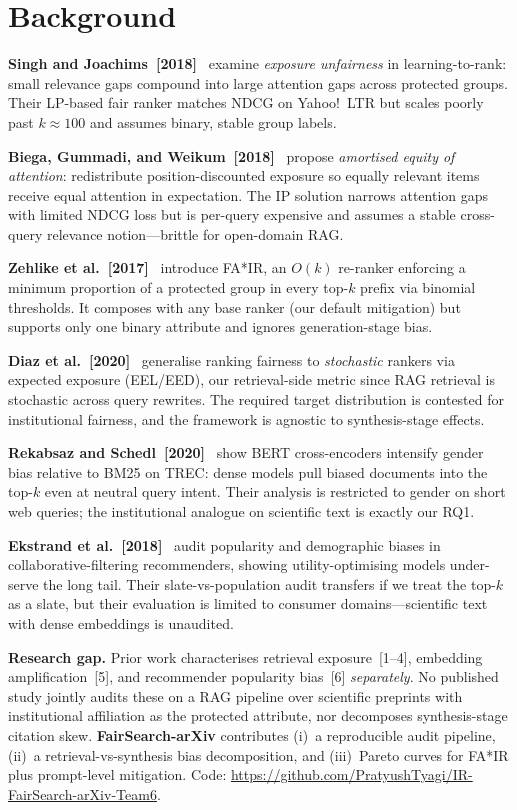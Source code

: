 \documentclass[sigconf]{acmart}
\begin{document}
\section{Background}

\textbf{Singh and Joachims~[2018]}~\cite{singh2018} examine \emph{exposure unfairness} in learning-to-rank: small relevance gaps compound into large attention gaps across protected groups. Their LP-based fair ranker matches NDCG on Yahoo!\ LTR but scales poorly past $k\!\approx\!100$ and assumes binary, stable group labels.

\textbf{Biega, Gummadi, and Weikum~[2018]}~\cite{biega2018} propose \emph{amortised equity of attention}: redistribute position-discounted exposure so equally relevant items receive equal attention in expectation. The IP solution narrows attention gaps with limited NDCG loss but is per-query expensive and assumes a stable cross-query relevance notion---brittle for open-domain RAG.

\textbf{Zehlike et al.~[2017]}~\cite{zehlike2017} introduce FA*IR, an $O(k)$ re-ranker enforcing a minimum proportion of a protected group in every top-$k$ prefix via binomial thresholds. It composes with any base ranker (our default mitigation) but supports only one binary attribute and ignores generation-stage bias.

\textbf{Diaz et al.~[2020]}~\cite{diaz2020} generalise ranking fairness to \emph{stochastic} rankers via expected exposure (EEL/EED), our retrieval-side metric since RAG retrieval is stochastic across query rewrites. The required target distribution is contested for institutional fairness, and the framework is agnostic to synthesis-stage effects.

\textbf{Rekabsaz and Schedl~[2020]}~\cite{rekabsaz2020} show BERT cross-encoders intensify gender bias relative to BM25 on TREC: dense models pull biased documents into the top-$k$ even at neutral query intent. Their analysis is restricted to gender on short web queries; the institutional analogue on scientific text is exactly our RQ1.

\textbf{Ekstrand et al.~[2018]}~\cite{ekstrand2018} audit popularity and demographic biases in collaborative-filtering recommenders, showing utility-optimising models under-serve the long tail. Their slate-vs-population audit transfers if we treat the top-$k$ as a slate, but their evaluation is limited to consumer domains---scientific text with dense embeddings is unaudited.

\textbf{Research gap.} Prior work characterises retrieval exposure~[1--4], embedding amplification~[5], and recommender popularity bias~[6] \emph{separately}. No published study jointly audits these on a RAG pipeline over scientific preprints with institutional affiliation as the protected attribute, nor decomposes synthesis-stage citation skew. \textbf{FairSearch-arXiv} contributes (i)~a reproducible audit pipeline, (ii)~a retrieval-vs-synthesis bias decomposition, and (iii)~Pareto curves for FA*IR plus prompt-level mitigation. Code: \url{https://github.com/PratyushTyagi/IR-FairSearch-arXiv-Team6}.
\end{document}
